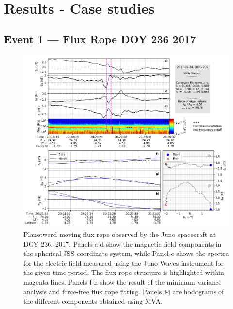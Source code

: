 \section{Results - Case studies}
\subsection{Event 1 — Flux Rope DOY 236 2017}

\begin{figure}
    \centering
    \includegraphics[width=\textwidth]{images6/event-1-fluxrope.jpg}
    \caption{Planetward moving flux rope observed by the Juno spacecraft at DOY 236, 2017. Panels a-d show the magnetic field components in the spherical JSS coordinate system, while Panel e shows the spectra for the electric field measured using the Juno Waves instrument for the given time period. The flux rope structure is highlighted within magenta lines. Panels f-h show the result of the minimum variance analysis and force-free flux rope fitting. Panels i-j are hodograms of the different components obtained using MVA.}
    \label{fig:event-1-fluxrope}
\end{figure}

